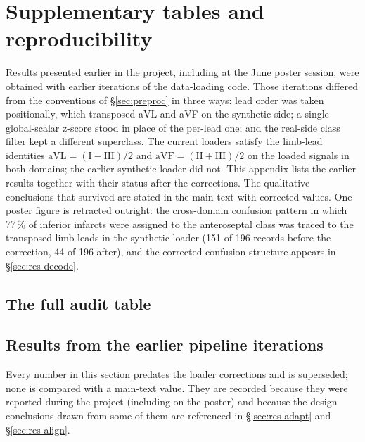 \chapter{Supplementary tables and reproducibility}
\label{app:supp}

Results presented earlier in the project, including at the June poster session, were obtained with earlier iterations of the data-loading code. Those iterations differed from the conventions of \S\ref{sec:preproc} in three ways: lead order was taken positionally, which transposed aVL and aVF on the synthetic side; a single global-scalar z-score stood in place of the per-lead one; and the real-side class filter kept a different superclass. The current loaders satisfy the limb-lead identities $\mathrm{aVL}=(\mathrm{I}-\mathrm{III})/2$ and $\mathrm{aVF}=(\mathrm{II}+\mathrm{III})/2$ on the loaded signals in both domains; the earlier synthetic loader did not. This appendix lists the earlier results together with their status after the corrections. The qualitative conclusions that survived are stated in the main text with corrected values. One poster figure is retracted outright: the cross-domain confusion pattern in which 77\,\% of inferior infarcts were assigned to the anteroseptal class was traced to the transposed limb leads in the synthetic loader (151 of 196 records before the correction, 44 of 196 after), and the corrected confusion structure appears in \S\ref{sec:res-decode}. 

\section{The full audit table}


\section[Earlier-pipeline results]{Results from the earlier pipeline iterations}
\label{app:prefix}

Every number in this section predates the loader corrections and is superseded; none is compared with a main-text value. They are recorded because they were reported during the project (including on the poster) and because the design conclusions drawn from some of them are referenced in \S\ref{sec:res-adapt} and \S\ref{sec:res-align}. 

